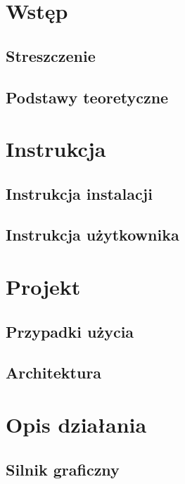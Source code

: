 \documentclass[a4paper,titlepage,10pt]{report}
\begin{document}
	
	\newpage

	\tableofcontents
	\newpage

	\chapter{Wstęp}\label{chap:wstęp}
	\section{Streszczenie}\label{sec:streszczenie}
	
	\newpage
	\section{Podstawy teoretyczne}\label{sec:podstawy teoretyczne}
	

	\chapter{Instrukcja}\label{chap:instrukcja}
	\section{Instrukcja instalacji}\label{sec:instrukcja użytkownika}
	
	\section{Instrukcja użytkownika}\label{sec:instrukcja użytkownika}
	

	\chapter{Projekt}\label{chap:projekt}
	\section{Przypadki użycia}\label{sec:przypadki użycia}
	
	\section{Architektura}\label{sec:architektura}
	

	\chapter{Opis działania}\label{chap:opis dzialania}
	\section{Silnik graficzny}\label{sec:silnik graficzny}
	
\end{document}
